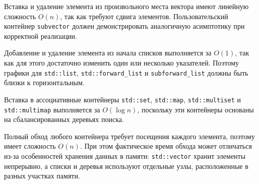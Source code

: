 \documentclass[a4paper,12pt]{article}
\begin{document}
Вставка и удаление элемента из произвольного места вектора имеют линейную сложность $O(n)$, так как требуют сдвига элементов. Пользовательский контейнер \texttt{subvector} должен демонстрировать аналогичную асимптотику при корректной реализации.

Добавление и удаление элемента из начала списков выполняется за $O(1)$, так как для этого достаточно изменить один или несколько указателей. Поэтому графики для \texttt{std::list}, \texttt{std::forward\_list} и \texttt{subforward\_list} должны быть близки к горизонтальным.

Вставка в ассоциативные контейнеры \texttt{std::set}, \texttt{std::map}, \texttt{std::multiset} и \texttt{std::multimap} выполняется за $O(\log n)$, поскольку эти контейнеры основаны на сбалансированных деревьях поиска.

Полный обход любого контейнера требует посещения каждого элемента, поэтому имеет сложность $O(n)$. При этом фактическое время обхода может отличаться из-за особенностей хранения данных в памяти: \texttt{std::vector} хранит элементы непрерывно, а списки и деревья используют отдельные узлы, расположенные в разных участках памяти.

\end{document}
